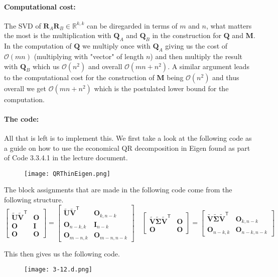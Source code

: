\documentclass{article}
\newcommand\tr{\mathsf{T}}
\begin{document}
\paragraph{Computational cost:} The SVD of $\mathbf{R}_{A}\mathbf{R}_{B} \in \mathbb{R}^{k,k}$ can be diregarded in terms of $m$ and $n$, what matters the most is the multiplication with $\mathbf{Q}_{A}$ and $\mathbf{Q}_{B}$ in the construction for $\mathbf{Q}$ and $\mathbf{M}$. In the computation of $\mathbf{Q}$ we multiply once with $\mathbf{Q}_{A}$ giving us the cost of $\mathcal{O}\left(mn\right)$ (multiplying with "vector" of length $n$) and then multiply the result with $\mathbf{Q}_{B}$ which us $\mathcal{O}\left(n^{2}\right)$ and overall $\mathcal{O}\left(mn + n^{2}\right)$. A similar argument leads to the computational cost for the construction of $\mathbf{M}$ being $\mathcal{O}\left(n^{2}\right)$ and thus overall we get $\mathcal{O}\left(mn + n^{2}\right)$ which is the postulated lower bound for the computation. 

\paragraph{The code:} All that is left is to implement this. We first take a look at the following code as a guide on how to use the economical QR decomposition in Eigen found as part of Code 3.3.4.1 in the lecture document.

\begin{figure}[!hbt]
    \centering
\texttt{[image: QRThinEigen.png]}
\end{figure}
The block assignments that are made in the following code come from the following structure.
\begin{equation*}
    \begin{bmatrix}
        \mathbf{\tilde{U}}\mathbf{\tilde{V}}^{\tr}  & \mathbf{O} \\
      \mathbf{O} & \mathbf{I} \\
      \mathbf{O} & \mathbf{O}
      
    \end{bmatrix} =
    \begin{bmatrix}
        \mathbf{\tilde{U}}\mathbf{\tilde{V}}^{\tr}  & \mathbf{O}_{k,n-k} \\
      \mathbf{O}_{n-k,k} & \mathbf{I}_{n-k} \\
      \mathbf{O}_{m-n,k} & \mathbf{O}_{m-n,n-k}
      
    \end{bmatrix} \quad 
    \begin{bmatrix}
        \mathbf{\tilde{V}}\mathbf{\tilde{\Sigma}}\mathbf{\tilde{V}}^{\tr}   & \mathbf{O} \\
        \mathbf{O} & \mathbf{O}
    \end{bmatrix}=\begin{bmatrix}
        \mathbf{\tilde{V}}\mathbf{\tilde{\Sigma}}\mathbf{\tilde{V}}^{\tr}   & \mathbf{O}_{k, n-k} \\
        \mathbf{O}_{n-k,k} & \mathbf{O}_{n-k,n-k}
    \end{bmatrix} 
\end{equation*}

\pagebreak

\noindent This then gives us the following code.
\begin{figure}[!hbt]
    \centering
\texttt{[image: 3-12.d.png]}
\end{figure}
\end{document}
